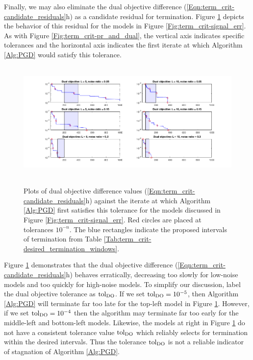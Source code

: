 \begin{enumerate}
Finally, we may also eliminate the dual objective difference (\ref{Eqn:term_crit-candidate_residuals}h) as a candidate residual for termination.  Figure \ref{Fig:term_crit-dual_obj} depicts the behavior of this residual for the models in Figure \ref{Fig:term_crit-signal_err}.  As with Figure \ref{Fig:term_crit-pr_and_dual}, the vertical axis indicates specific tolerances and the horizontal axis indicates the first iterate at which Algorithm \ref{Alg:PGD} would satisfy this tolerance.


\begin{figure}[H]
\centering
\hbox{\hspace{-2.1cm} \includegraphics[scale=0.6]{term_crit-dual_obj} }\vspace{-0.4cm}
\caption{Plots of dual objective difference values (\ref{Eqn:term_crit-candidate_residuals}h) against the iterate at which Algorithm \ref{Alg:PGD} first satisfies this tolerance for the models discussed in Figure \ref{Fig:term_crit-signal_err}.  Red circles are placed at tolerances $10^{-n}$.  The blue rectangles indicate the proposed intervals of termination from Table \ref{Tab:term_crit-desired_termination_windows}.}
\label{Fig:term_crit-dual_obj}
\end{figure}


Figure \ref{Fig:term_crit-dual_obj} demonstrates that the dual objective difference (\ref{Eqn:term_crit-candidate_residuals}h) behaves erratically, decreasing too slowly for low-noise models and too quickly for high-noise models.  To simplify our discussion, label the dual objective tolerance as $\textnormal{tol}_\text{DO}$.  If we set $\textnormal{tol}_\text{DO} = 10^{-5}$, then Algorithm \ref{Alg:PGD} will terminate far too late for the top-left model in Figure \ref{Fig:term_crit-dual_obj}.  However, if we set $\textnormal{tol}_\text{DO} = 10^{-4}$ then the algorithm may terminate far too early for the middle-left and bottom-left models.  Likewise, the models at right in Figure \ref{Fig:term_crit-dual_obj} do not have a consistent tolerance value $\textnormal{tol}_\text{DO}$ which reliably selects for termination within the desired intervals.  Thus the tolerance $\textnormal{tol}_\text{DO}$ is not a reliable indicator of stagnation of Algorithm \ref{Alg:PGD}.  


\end{enumerate}

